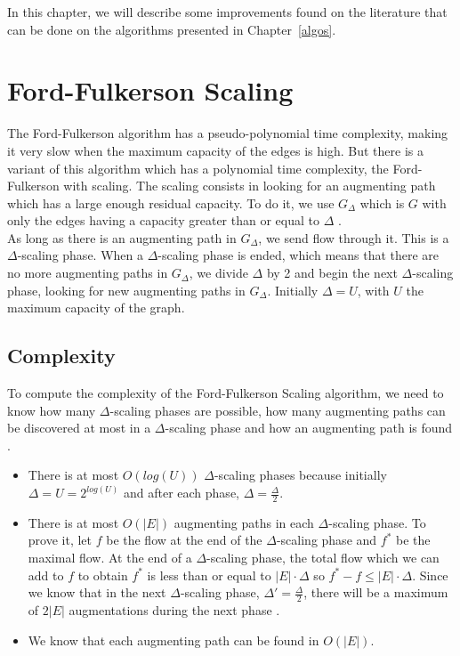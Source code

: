 
In this chapter, we will describe some improvements found on the literature \cite{scaling,networkflows} that can be done on the algorithms presented in Chapter~\ref{algos}.

\section{Ford-Fulkerson Scaling}
The Ford-Fulkerson algorithm has a pseudo-polynomial time complexity, making it very slow when the maximum capacity of the edges is high. But there is a variant of this algorithm which has a polynomial time complexity, the Ford-Fulkerson with scaling. The scaling consists in looking for an augmenting path which has a large enough residual capacity. To do it, we use $G_\Delta$ which is $G$ with only the edges having a capacity greater than or equal to $\Delta$ \cite{lectu5}. \\

As long as there is an augmenting path in $G_\Delta$, we send flow through it. This is a $\Delta$-scaling phase. When a $\Delta$-scaling phase is ended, which means that there are no more augmenting paths in $G_\Delta$, we divide $\Delta$ by 2 and begin the next $\Delta$-scaling phase, looking for new augmenting paths in $G_\Delta$. Initially $\Delta = U$, with $U$ the maximum capacity of the graph.

\subsection{Complexity}
To compute the complexity of the Ford-Fulkerson Scaling algorithm, we need to know how many $\Delta$-scaling phases are possible, how many augmenting paths can be discovered at most in a $\Delta$-scaling phase and how an augmenting path is found \cite{lectu7}.

\begin{itemize}
\item There is at most $O(log(U))$ $\Delta$-scaling phases because initially $\Delta = U = 2^{log(U)}$ and after each phase, $\Delta=\frac{\Delta}{2}$.
\item There is at most $O(|E|)$ augmenting paths in each $\Delta$-scaling phase. To prove it, let $f$ be the flow at the end of the $\Delta$-scaling phase and $f^*$ be the maximal flow. At the end of a $\Delta$-scaling phase, the total flow which we can add to $f$ to obtain $f^*$ is less than or equal to $|E| \cdot \Delta$ so $f^*-f \leq |E| \cdot \Delta$. Since we know that in the next $\Delta$-scaling phase, $\Delta'=\frac{\Delta}{2}$, there will be a maximum of $2|E|$ augmentations during the next phase \cite{lectu5}.
\item We know that each augmenting path can be found in $O(|E|)$.
\end{itemize}


